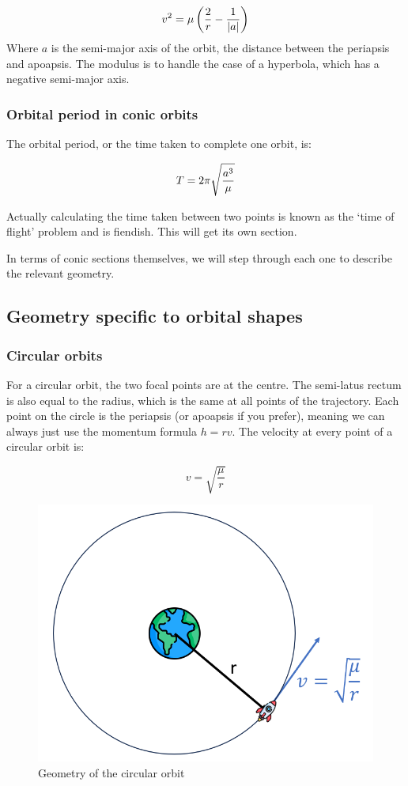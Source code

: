 \documentclass{report}
\begin{document}
$$
v^2 = \mu \left({ 2 \over r} - {1 \over |a|}\right)
$$
Where $a$ is the semi-major axis of the orbit, the distance between the periapsis and apoapsis. The modulus is to handle the case of a hyperbola, which has a negative semi-major axis.

\subsubsection{Orbital period in conic orbits}

The orbital period, or the time taken to complete one orbit, is:

$$
T=2\pi\sqrt{a^3\over{\mu}}
$$

Actually calculating the time taken between two points is known as the `time of flight' problem and is fiendish. This will get its own section.

In terms of conic sections themselves, we will step through each one to describe the relevant geometry.

\subsection{Geometry specific to orbital shapes}

\subsubsection{Circular orbits}
For a circular orbit, the two focal points are at the centre. The semi-latus rectum is also equal to the radius, which is the same at all points of the trajectory. Each point on the circle is the periapsis (or apoapsis if you prefer), meaning we can always just use the momentum formula $h=rv$. The velocity at every point of a circular orbit is:

$$
v = \sqrt{\frac{\mu}{r}}
$$

\begin{figure}[H]
    \centering
    \includegraphics[width=0.5\linewidth]{Latex Images/circleorbit.png}
    \caption{Geometry of the circular orbit}
    \label{fig:circular}
\end{figure}
\end{document}
